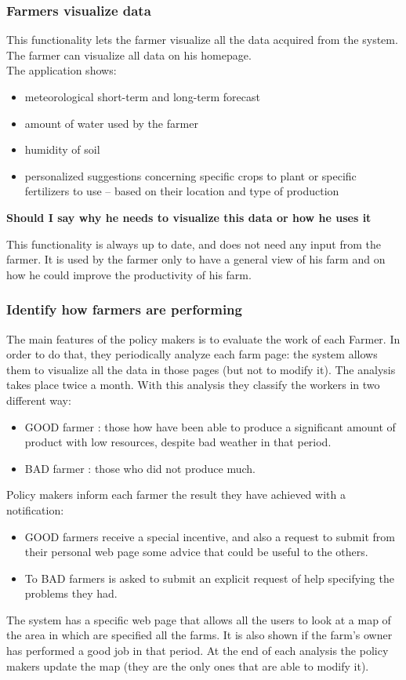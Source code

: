 \subsubsection{Farmers visualize data}
This functionality lets the farmer visualize all the data 
acquired from the system. The farmer can visualize all data on his homepage.\\
The application shows:
\begin{itemize}
    \item meteorological  short-term and long-term forecast
    \item amount of water used by the farmer
    \item humidity of soil 
    \item personalized suggestions concerning specific crops to plant or specific 
    fertilizers to use – based on their location and type of production
\end{itemize}

\textbf{Should I say why he needs to visualize this data or how he uses it}


This functionality is always up to date, and does not need 
any input from the farmer.
It is used by the farmer only to have a general view of 
his farm and on how he could improve the productivity of his farm.



\subsubsection{Identify how farmers are performing}
The main features of the policy makers is to evaluate the work of each Farmer. 
In order to do that, they periodically analyze each farm page: 
the system allows them to visualize all the data in those pages 
(but not to modify it).
The analysis takes place twice a month.
With this analysis they classify the workers in two different way:
\begin{itemize}
    \item GOOD farmer : those how have been able to produce a significant amount of product with low resources, despite bad weather in that period.
    \item BAD farmer : those who did not produce much.
\end{itemize}
Policy makers inform each farmer the result they have achieved with a notification: 
\begin{itemize}
    \item GOOD farmers receive a special 
    incentive, and also a request to submit 
    from their personal web page some advice that could be useful to the others. 
    \item To BAD farmers is asked to submit an explicit request of help specifying the problems they had.
\end{itemize}
The system has a specific web page that allows all 
the users to look at a map of the area in which are 
specified all the farms. It is also shown if the farm's owner has performed 
a good job in that period.
At the end of each analysis the policy makers 
update the map (they are the only ones that are able to modify it).


